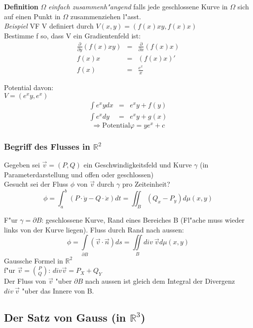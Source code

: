 \documentclass[10pt, a4paper, twocolumn]{scrartcl}
\begin{document}
\textbf{Definition} $\Omega$ \textit{einfach zusammenh"angend} falls jede geschlossene Kurve in $\Omega$ sich auf einen Punkt in $\Omega$ zusammenziehen l"asst.\\

\textit{Beispiel} VF V definiert durch $V(x,y)=(f(x)xy,f(x)x)$\\
Bestimme f so, dass V ein Gradientenfeld ist:
\begin{eqnarray}
 \frac{\partial}{\partial y}(f(x)xy)& 	=&	\frac{\partial}{\partial x}(f(x)x)\nonumber\\
 f(x)x&					=&	(f(x)x)'\nonumber\\
 f(x)&					=&	\frac{e^x}{x}\nonumber
\end{eqnarray}

Potential davon:\\
$V=(e^x y, e^x)$
\begin{eqnarray}
 \int e^x y dx &	=&	e^x y +f(y)\nonumber\\
 \int e^x dy&		=&	e^x y +g(x)\nonumber
\end{eqnarray}
$$\Rightarrow \mbox{Potential} \varphi =ye^x+c$$

\subsubsection{Begriff des Flusses in $\mathbb{R}^2$}

Gegeben sei $\vec{v}=(P,Q)$ ein Geschwindigkeitsfeld und Kurve $\gamma$ (in Parameterdarstellung und offen oder geschlossen)\\
Gesucht sei der Fluss $\phi$ von $\vec{v}$ durch $\gamma$ pro Zeiteinheit?
$$\phi=\int^b_a (P\cdotp \dot{y}-Q\cdotp \dot{x})dt=\iint_B (Q_x-P_y) d\mu(x,y)$$

F"ur $\gamma=\partial B$:
geschlossene Kurve, Rand eines Bereiches B (Fl"ache muss wieder links von der Kurve liegen). Fluss durch Rand nach aussen:
$$\phi=\int\limits_{\partial B}(\vec{v}\cdotp\vec{n})ds=\iint\limits_B div\:\vec{v} d\mu(x,y)$$
Gaussche Formel in $\mathbb{R}^2$\\
f"ur $\vec{v}=\binom{P}{Q}$: $div \vec{v}=P_X+Q_Y$\\

Der Fluss von $\vec{v}$ "uber $\partial B$ nach aussen ist gleich dem Integral der Divergenz $div\:\vec{v}$ "uber das Innere von B.

\subsection{Der Satz von Gauss (in $\mathbb{R}^3$)}
\end{document}
